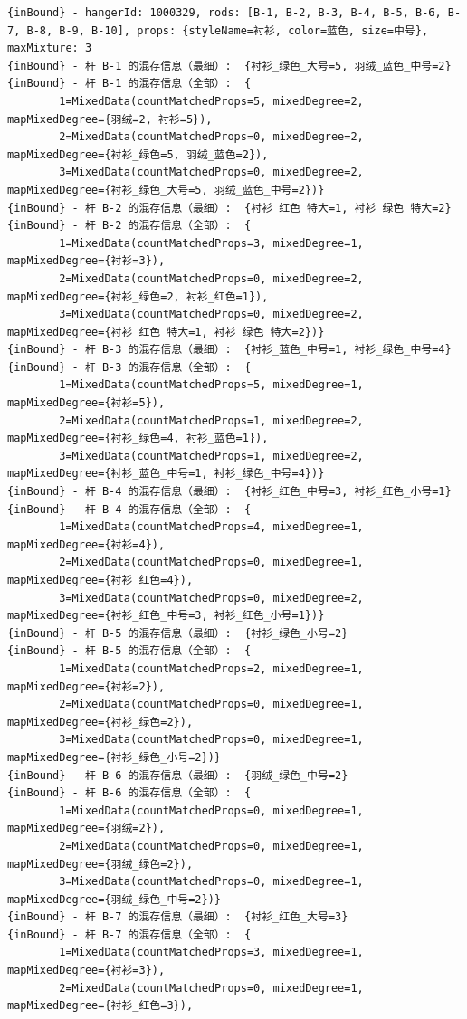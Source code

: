 {\begin{verbatim}
{inBound} - hangerId: 1000329, rods: [B-1, B-2, B-3, B-4, B-5, B-6, B-7, B-8, B-9, B-10], props: {styleName=衬衫, color=蓝色, size=中号}, maxMixture: 3
{inBound} - 杆 B-1 的混存信息（最细）:  {衬衫_绿色_大号=5, 羽绒_蓝色_中号=2}
{inBound} - 杆 B-1 的混存信息（全部）:  {
		1=MixedData(countMatchedProps=5, mixedDegree=2, mapMixedDegree={羽绒=2, 衬衫=5}), 
		2=MixedData(countMatchedProps=0, mixedDegree=2, mapMixedDegree={衬衫_绿色=5, 羽绒_蓝色=2}), 
		3=MixedData(countMatchedProps=0, mixedDegree=2, mapMixedDegree={衬衫_绿色_大号=5, 羽绒_蓝色_中号=2})}
{inBound} - 杆 B-2 的混存信息（最细）:  {衬衫_红色_特大=1, 衬衫_绿色_特大=2}
{inBound} - 杆 B-2 的混存信息（全部）:  {
		1=MixedData(countMatchedProps=3, mixedDegree=1, mapMixedDegree={衬衫=3}), 
		2=MixedData(countMatchedProps=0, mixedDegree=2, mapMixedDegree={衬衫_绿色=2, 衬衫_红色=1}), 
		3=MixedData(countMatchedProps=0, mixedDegree=2, mapMixedDegree={衬衫_红色_特大=1, 衬衫_绿色_特大=2})}
{inBound} - 杆 B-3 的混存信息（最细）:  {衬衫_蓝色_中号=1, 衬衫_绿色_中号=4}
{inBound} - 杆 B-3 的混存信息（全部）:  {
		1=MixedData(countMatchedProps=5, mixedDegree=1, mapMixedDegree={衬衫=5}), 
		2=MixedData(countMatchedProps=1, mixedDegree=2, mapMixedDegree={衬衫_绿色=4, 衬衫_蓝色=1}), 
		3=MixedData(countMatchedProps=1, mixedDegree=2, mapMixedDegree={衬衫_蓝色_中号=1, 衬衫_绿色_中号=4})}
{inBound} - 杆 B-4 的混存信息（最细）:  {衬衫_红色_中号=3, 衬衫_红色_小号=1}
{inBound} - 杆 B-4 的混存信息（全部）:  {
		1=MixedData(countMatchedProps=4, mixedDegree=1, mapMixedDegree={衬衫=4}), 
		2=MixedData(countMatchedProps=0, mixedDegree=1, mapMixedDegree={衬衫_红色=4}), 
		3=MixedData(countMatchedProps=0, mixedDegree=2, mapMixedDegree={衬衫_红色_中号=3, 衬衫_红色_小号=1})}
{inBound} - 杆 B-5 的混存信息（最细）:  {衬衫_绿色_小号=2}
{inBound} - 杆 B-5 的混存信息（全部）:  {
		1=MixedData(countMatchedProps=2, mixedDegree=1, mapMixedDegree={衬衫=2}), 
		2=MixedData(countMatchedProps=0, mixedDegree=1, mapMixedDegree={衬衫_绿色=2}), 
		3=MixedData(countMatchedProps=0, mixedDegree=1, mapMixedDegree={衬衫_绿色_小号=2})}
{inBound} - 杆 B-6 的混存信息（最细）:  {羽绒_绿色_中号=2}
{inBound} - 杆 B-6 的混存信息（全部）:  {
		1=MixedData(countMatchedProps=0, mixedDegree=1, mapMixedDegree={羽绒=2}), 
		2=MixedData(countMatchedProps=0, mixedDegree=1, mapMixedDegree={羽绒_绿色=2}), 
		3=MixedData(countMatchedProps=0, mixedDegree=1, mapMixedDegree={羽绒_绿色_中号=2})}
{inBound} - 杆 B-7 的混存信息（最细）:  {衬衫_红色_大号=3}
{inBound} - 杆 B-7 的混存信息（全部）:  {
		1=MixedData(countMatchedProps=3, mixedDegree=1, mapMixedDegree={衬衫=3}), 
		2=MixedData(countMatchedProps=0, mixedDegree=1, mapMixedDegree={衬衫_红色=3}), 

\end{verbatim}}
